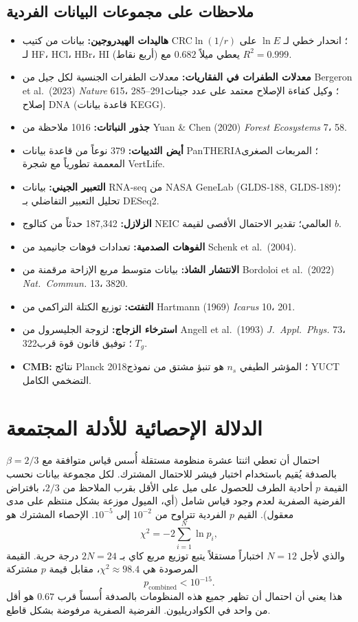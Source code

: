 \documentclass[12pt,a4paper]{article}
\begin{document}
	\subsection*{ملاحظات على مجموعات البيانات الفردية}
	\begin{itemize}
		\item \textbf{هاليدات الهيدروجين:} بيانات من كتيب CRC؛ انحدار خطي لـ \(\ln E\) على \(\ln(1/r)\) لـ HF، HCl، HBr، HI (أربع نقاط) يعطي ميلاً \(0.682\) مع \(R^2=0.999\).
		\item \textbf{معدلات الطفرات في الفقاريات:} معدلات الطفرات الجنسية لكل جيل من Bergeron et al.\ (2023) \textit{Nature} 615، 285--291؛ وكيل كفاءة الإصلاح معتمد على عدد جينات إصلاح DNA (قاعدة بيانات KEGG).
		\item \textbf{جذور النباتات:} 1016 ملاحظة من Yuan \& Chen (2020) \textit{Forest Ecosystems} 7، 58.
		\item \textbf{أيض الثدييات:} 379 نوعاً من قاعدة بيانات PanTHERIA؛ المربعات الصغرى المعممة تطورياً مع شجرة VertLife.
		\item \textbf{التعبير الجيني:} بيانات RNA‑seq من NASA GeneLab (GLDS‑188, GLDS‑189)؛ تحليل التعبير التفاضلي بـ DESeq2.
		\item \textbf{الزلازل:} 187,342 حدثاً من كتالوج NEIC العالمي؛ تقدير الاحتمال الأقصى لقيمة \(b\).
		\item \textbf{الفوهات الصدمية:} تعدادات فوهات جانيميد من Schenk et al.\ (2004).
		\item \textbf{الانتشار الشاذ:} بيانات متوسط مربع الإزاحة مرقمنة من Bordoloi et al.\ (2022) \textit{Nat.\ Commun.} 13، 3820.
		\item \textbf{التفتت:} توزيع الكتلة التراكمي من Hartmann (1969) \textit{Icarus} 10، 201.
		\item \textbf{استرخاء الزجاج:} لزوجة الجليسرول من Angell et al.\ (1993) \textit{J.\ Appl.\ Phys.} 73، 322؛ توفيق قانون قوة قرب \(T_g\).
		\item \textbf{CMB:} نتائج Planck 2018؛ المؤشر الطيفي \(n_s\) هو تنبؤ مشتق من نموذج YUCT التضخمي الكامل.
	\end{itemize}
	
	\section{الدلالة الإحصائية للأدلة المجتمعة}
	
	احتمال أن تعطي اثنتا عشرة منظومة مستقلة أُسس قياس متوافقة مع \(\beta = 2/3\) بالصدفة يُقيم باستخدام اختبار فيشر للاحتمال المشترك. لكل مجموعة بيانات نحسب القيمة \(p\) أحادية الطرف للحصول على ميل على الأقل بقرب الملاحظ من \(2/3\)، بافتراض الفرضية الصفرية لعدم وجود قياس شامل (أي، الميول موزعة بشكل منتظم على مدى معقول). القيم \(p\) الفردية تتراوح من \(10^{-2}\) إلى \(10^{-5}\). الإحصاء المشترك هو
	\[
	\chi^2 = -2\sum_{i=1}^{N} \ln p_i,
	\]
	والذي لأجل \(N=12\) اختباراً مستقلاً يتبع توزيع مربع كاي بـ \(2N = 24\) درجة حرية. القيمة المرصودة هي \(\chi^2 \approx 98.4\)، مقابل قيمة \(p\) مشتركة
	\[
	p_{\mathrm{combined}} < 10^{-15}.
	\]
	هذا يعني أن احتمال أن تظهر جميع هذه المنظومات بالصدفة أُسساً قرب \(0.67\) هو أقل من واحد في الكوادريليون. الفرضية الصفرية مرفوضة بشكل قاطع.
	
\end{document}
